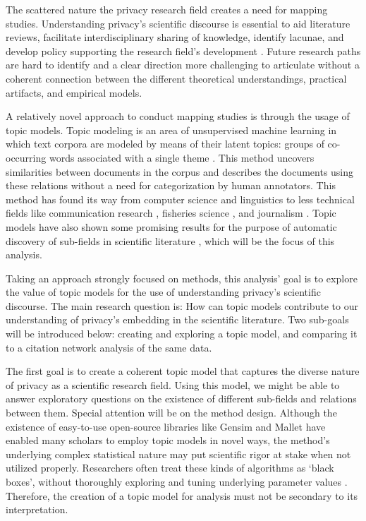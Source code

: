 \documentclass[runningheads]{llncs}
\begin{document}
The scattered nature the privacy research field creates a need for mapping studies. Understanding privacy’s scientific discourse is essential to aid literature reviews, facilitate interdisciplinary sharing of knowledge, identify lacunae, and develop policy supporting the research field's development \cite{noyons_bibliometric_1999}. Future research paths are hard to identify and a clear direction more challenging to articulate without a coherent connection between the different theoretical understandings, practical artifacts, and empirical models. 

A relatively novel approach to conduct mapping studies is through the usage of topic models. Topic modeling is an area of unsupervised machine learning in which text corpora are modeled by means of their latent topics: groups of co-occurring words associated with a single theme \cite{dimaggio_exploiting_2013}. This method uncovers similarities between documents in the corpus and describes the documents using these relations without a need for categorization by human annotators. This method has found its way from computer science and linguistics to less technical fields like communication research \cite{maier_applying_2018}, fisheries science \cite{syed_narrow_2018}, and journalism \cite{jacobi_quantitative_2016}. Topic models have also shown some promising results for the purpose of automatic discovery of sub-fields in scientific literature \cite{mimno_bibliometric_2006}, which will be the focus of this analysis.

Taking an approach strongly focused on methods, this analysis’ goal is to explore the value of topic models for the use of understanding privacy’s scientific discourse. The main research question is: How can topic models contribute to our understanding of privacy’s embedding in the scientific literature. Two sub-goals will be introduced below: creating and exploring a topic model, and comparing it to a citation network analysis of the same data.

The first goal is to create a coherent topic model that captures the diverse nature of privacy as a scientific research field. Using this model, we might be able to answer exploratory questions on the existence of different sub-fields and relations between them. Special attention will be on the method design. Although the existence of easy-to-use open-source libraries like Gensim \cite{rehurek_gensimpython_2011} and Mallet \cite{mccallum_malletmachine_2002} have enabled many scholars to employ topic models in novel ways, the method’s underlying complex statistical nature may put scientific rigor at stake when not utilized properly. Researchers often treat these kinds of algorithms as ‘black boxes’, without thoroughly exploring and tuning underlying parameter values \cite{chen_survey_2016}. Therefore, the creation of a topic model for analysis must not be secondary to its interpretation.
\end{document}
